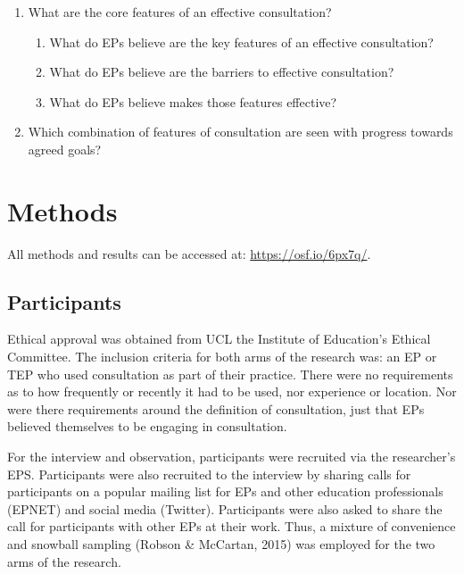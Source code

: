 \documentclass[
  english,
  man,floatsintext]{apa6}
\begin{document}
\begin{enumerate}
\def\labelenumi{\arabic{enumi}.}
\item
  What are the core features of an effective consultation?

  \begin{enumerate}
  \def\labelenumii{\roman{enumii})}
  \item
    What do EPs believe are the key features of an effective
    consultation?
  \item
    What do EPs believe are the barriers to effective consultation?
  \item
    What do EPs believe makes those features effective?
  \end{enumerate}
\item
  Which combination of features of consultation are seen with progress
  towards agreed goals?
\end{enumerate}

\hypertarget{methods}{%
\section{Methods}\label{methods}}

All methods and results can be accessed at: \url{https://osf.io/6px7q/}.

\hypertarget{participants}{%
\subsection{Participants}\label{participants}}

Ethical approval was obtained from UCL the Institute of Education's
Ethical Committee. The inclusion criteria for both arms of the research
was: an EP or TEP who used consultation as part of their practice. There
were no requirements as to how frequently or recently it had to be used,
nor experience or location. Nor were there requirements around the
definition of consultation, just that EPs believed themselves to be
engaging in consultation.

For the interview and observation, participants were recruited via the researcher's EPS. Participants were also recruited to the interview by sharing calls for participants on a popular
mailing list for EPs and other education professionals (EPNET) and
social media (Twitter). Participants were also asked to share the call
for participants with other EPs at their work. Thus, a mixture of
convenience and snowball sampling (Robson \& McCartan, 2015) was
employed for the two arms of the research.
\end{document}
